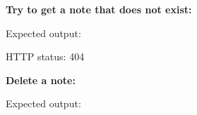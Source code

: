 \noindent{}\textbf{Try to get a note that does not exist:}

\begin{codebox}[short]

\begin{Shaded}
\begin{Highlighting}[]
\end{Highlighting}
\end{Shaded}

\end{codebox}

\noindent{}Expected output:

\begin{codebox}[short]

\begin{Shaded}
\begin{Highlighting}[]
\FunctionTok{\{}\FunctionTok{:}\FunctionTok{\}}
\end{Highlighting}
\end{Shaded}

\end{codebox}

\noindent{}HTTP status: 404

\textbf{Delete a note:}

\begin{codebox}[short]

\begin{Shaded}
\begin{Highlighting}[]
 
\end{Highlighting}
\end{Shaded}

\end{codebox}

\noindent{}Expected output:

\begin{codebox}[short]

\begin{Shaded}
\begin{Highlighting}[]
\FunctionTok{\{}\FunctionTok{:}\FunctionTok{\}}
\end{Highlighting}
\end{Shaded}

\end{codebox}

